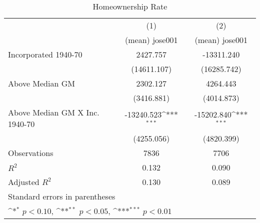 \begin{table}[htbp]\centering
\def\sym#1{\ifmmode^{#1}\else\(^{#1}\)\fi}
\caption{Homeownership Rate}
\begin{tabular}{l*{2}{c}}
\hline\hline
                    &\multicolumn{1}{c}{(1)}&\multicolumn{1}{c}{(2)}\\
                    &\multicolumn{1}{c}{(mean) jose001}&\multicolumn{1}{c}{(mean) jose001}\\
\hline
Incorporated 1940-70&    2427.757         &  -13311.240         \\
                    & (14611.107)         & (16285.742)         \\
[1em]
Above Median GM     &    2302.127         &    4264.443         \\
                    &  (3416.881)         &  (4014.873)         \\
[1em]
Above Median GM X Inc. 1940-70&  -13240.523\sym{***}&  -15202.840\sym{***}\\
                    &  (4255.056)         &  (4820.399)         \\
\hline
Observations        &        7836         &        7706         \\
\(R^{2}\)           &       0.132         &       0.090         \\
Adjusted \(R^{2}\)  &       0.130         &       0.089         \\
\hline\hline
\multicolumn{3}{l}{\footnotesize Standard errors in parentheses}\\
\multicolumn{3}{l}{\footnotesize \sym{*} \(p<0.10\), \sym{**} \(p<0.05\), \sym{***} \(p<0.01\)}\\
\end{tabular}
\end{table}
